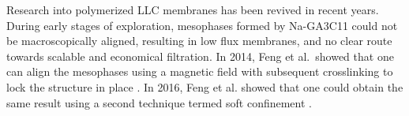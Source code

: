 \documentclass{article}
\begin{document}
  Research into polymerized LLC membranes has been revived in recent years.
  During early stages of exploration, mesophases formed by Na-GA3C11 could not be
  macroscopically aligned, resulting in low flux membranes, and no clear route
  towards scalable and economical filtration. In 2014, Feng et al.~showed that
  one can align the mesophases using a magnetic field with subsequent
  crosslinking to lock the structure in place \cite{feng_scalable_2014}. In 2016,
  Feng et al. showed that one could obtain the same result using a second
  technique termed soft confinement \cite{feng_thin_2016}.


\end{document}
